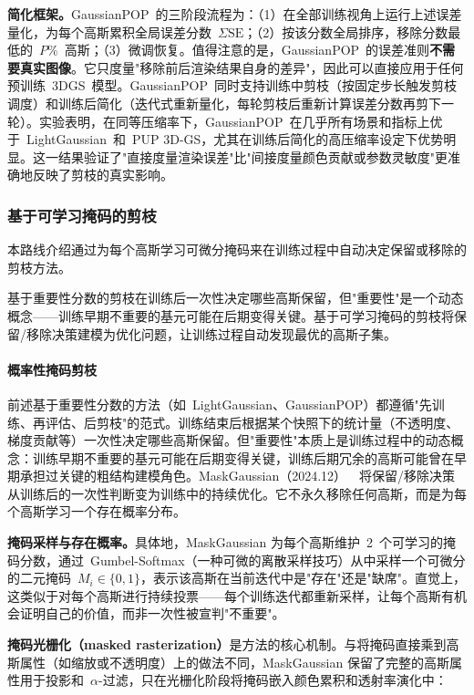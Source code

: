 \textbf{简化框架。}GaussianPOP~的三阶段流程为：（1）在全部训练视角上运行上述误差量化，为每个高斯累积全局误差分数~$\Sigma\mathrm{SE}$；（2）按该分数全局排序，移除分数最低的~$P\%$~高斯；（3）微调恢复。值得注意的是，GaussianPOP~的误差准则\textbf{不需要真实图像}。它只度量"移除前后渲染结果自身的差异"，因此可以直接应用于任何预训练~3DGS~模型。GaussianPOP~同时支持训练中剪枝（按固定步长触发剪枝调度）和训练后简化（迭代式重新量化，每轮剪枝后重新计算误差分数再剪下一轮）。实验表明，在同等压缩率下，GaussianPOP~在几乎所有场景和指标上优于~LightGaussian~和~PUP 3D-GS，尤其在训练后简化的高压缩率设定下优势明显。这一结果验证了"直接度量渲染误差"比"间接度量颜色贡献或参数灵敏度"更准确地反映了剪枝的真实影响。

\subsubsection{基于可学习掩码的剪枝}

本路线介绍通过为每个高斯学习可微分掩码来在训练过程中自动决定保留或移除的剪枝方法。

基于重要性分数的剪枝在训练后一次性决定哪些高斯保留，但"重要性"是一个动态概念——训练早期不重要的基元可能在后期变得关键。基于可学习掩码的剪枝将保留/移除决策建模为优化问题，让训练过程自动发现最优的高斯子集。

\paragraph{概率性掩码剪枝}

前述基于重要性分数的方法（如~LightGaussian、GaussianPOP）都遵循"先训练、再评估、后剪枝"的范式。训练结束后根据某个快照下的统计量（不透明度、梯度贡献等）一次性决定哪些高斯保留。但"重要性"本质上是训练过程中的动态概念：训练早期不重要的基元可能在后期变得关键，训练后期冗余的高斯可能曾在早期承担过关键的粗结构建模角色。MaskGaussian（2024.12）~\cite{2412_20522}~将保留/移除决策从训练后的一次性判断变为训练中的持续优化。它不永久移除任何高斯，而是为每个高斯学习一个存在概率分布。

\textbf{掩码采样与存在概率。}具体地，MaskGaussian 为每个高斯维护~2~个可学习的掩码分数，通过~Gumbel-Softmax（一种可微的离散采样技巧）从中采样一个可微分的二元掩码~$M_i \in \{0, 1\}$，表示该高斯在当前迭代中是"存在"还是"缺席"。直觉上，这类似于对每个高斯进行持续投票——每个训练迭代都重新采样，让每个高斯有机会证明自己的价值，而非一次性被宣判"不重要"。

\textbf{掩码光栅化（masked rasterization）}是方法的核心机制。与将掩码直接乘到高斯属性（如缩放或不透明度）上的做法不同，MaskGaussian 保留了完整的高斯属性用于投影和~$\alpha$-过滤，只在光栅化阶段将掩码嵌入颜色累积和透射率演化中：

